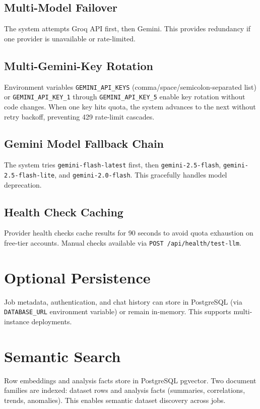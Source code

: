 \subsection{Multi-Model Failover}

The system attempts Groq API first, then Gemini. This provides redundancy if one provider is unavailable or rate-limited.

\subsection{Multi-Gemini-Key Rotation}

Environment variables \texttt{GEMINI\_API\_KEYS} (comma/space/semicolon-separated list) or \texttt{GEMINI\_API\_KEY\_1} through \texttt{GEMINI\_API\_KEY\_5} enable key rotation without code changes. When one key hits quota, the system advances to the next without retry backoff, preventing 429 rate-limit cascades.

\subsection{Gemini Model Fallback Chain}

The system tries \texttt{gemini-flash-latest} first, then \texttt{gemini-2.5-flash}, \texttt{gemini-2.5-flash-lite}, and \texttt{gemini-2.0-flash}. This gracefully handles model deprecation.

\subsection{Health Check Caching}

Provider health checks cache results for 90 seconds to avoid quota exhaustion on free-tier accounts. Manual checks available via \texttt{POST /api/health/test-llm}.

\section{Optional Persistence}

Job metadata, authentication, and chat history can store in PostgreSQL (via \texttt{DATABASE\_URL} environment variable) or remain in-memory. This supports multi-instance deployments.

\section{Semantic Search}

Row embeddings and analysis facts store in PostgreSQL pgvector. Two document families are indexed: dataset rows and analysis facts (summaries, correlations, trends, anomalies). This enables semantic dataset discovery across jobs.

